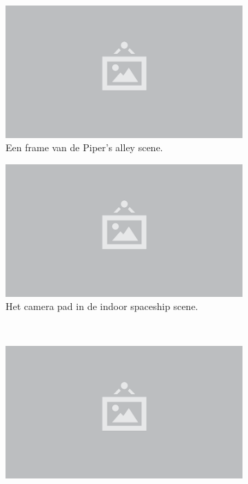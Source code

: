 \begin{figure}[p]
  \begin{subfigure}[b]{.49\linewidth}
    \centering\includegraphics{./img/raw/placeholder.png}
    \caption{Een frame van de Piper's alley scene.}\label{fig:test-suite-pipers-alley:frame}
  \end{subfigure}%
  \begin{subfigure}[b]{.49\linewidth}
    \centering\includegraphics{./img/raw/placeholder.png}
    \caption{Het camera pad in de indoor spaceship scene.}\label{fig:test-suite-pipers-alley:camera}
  \end{subfigure}
  \\
  \begin{subfigure}[b]{.49\linewidth}
    \centering\includegraphics{./img/raw/placeholder.png}

\end{subfigure}
\end{figure}
